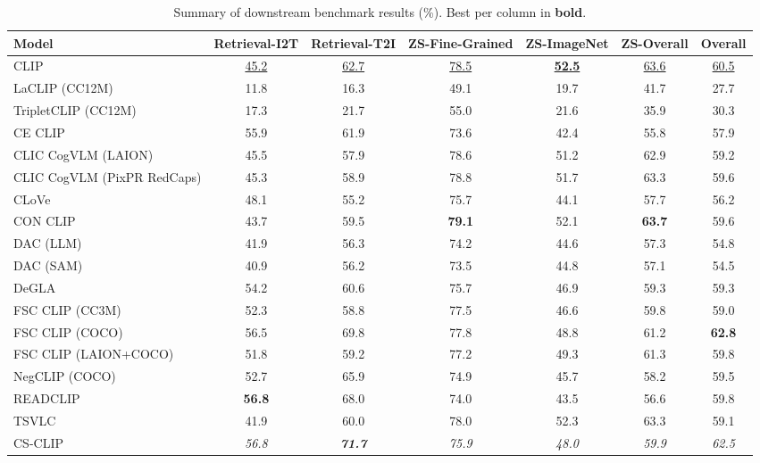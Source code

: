 \begin{table}[t]
  \centering
  \small
  \caption{Summary of downstream benchmark results (\%). Best per column in \textbf{bold}.}
  \label{tab:downstream_summary}
  \setlength{\tabcolsep}{4pt}
  \begin{tabular}{lcccccc}
    \toprule
    Model & Retrieval-I2T & Retrieval-T2I & ZS-Fine-Grained & ZS-ImageNet & ZS-Overall & Overall \\
    \midrule
    CLIP & \underline{45.2} & \underline{62.7} & \underline{78.5} & \underline{\textbf{52.5}} & \underline{63.6} & \underline{60.5} \\
    \midrule
    LaCLIP (CC12M) & 11.8 & 16.3 & 49.1 & 19.7 & 41.7 & 27.7 \\
    TripletCLIP (CC12M) & 17.3 & 21.7 & 55.0 & 21.6 & 35.9 & 30.3 \\
    \midrule
    CE CLIP & 55.9 & 61.9 & 73.6 & 42.4 & 55.8 & 57.9 \\
    CLIC CogVLM (LAION) & 45.5 & 57.9 & 78.6 & 51.2 & 62.9 & 59.2 \\
    CLIC CogVLM (PixPR RedCaps) & 45.3 & 58.9 & 78.8 & 51.7 & 63.3 & 59.6 \\
    CLoVe & 48.1 & 55.2 & 75.7 & 44.1 & 57.7 & 56.2 \\
    CON CLIP & 43.7 & 59.5 & \textbf{79.1} & 52.1 & \textbf{63.7} & 59.6 \\
    DAC (LLM) & 41.9 & 56.3 & 74.2 & 44.6 & 57.3 & 54.8 \\
    DAC (SAM) & 40.9 & 56.2 & 73.5 & 44.8 & 57.1 & 54.5 \\
    DeGLA & 54.2 & 60.6 & 75.7 & 46.9 & 59.3 & 59.3 \\
    FSC CLIP (CC3M) & 52.3 & 58.8 & 77.5 & 46.6 & 59.8 & 59.0 \\
    FSC CLIP (COCO) & 56.5 & 69.8 & 77.8 & 48.8 & 61.2 & \textbf{62.8} \\
    FSC CLIP (LAION+COCO) & 51.8 & 59.2 & 77.2 & 49.3 & 61.3 & 59.8 \\
    NegCLIP (COCO) & 52.7 & 65.9 & 74.9 & 45.7 & 58.2 & 59.5 \\
    READCLIP & \textbf{56.8} & 68.0 & 74.0 & 43.5 & 56.6 & 59.8 \\
    TSVLC & 41.9 & 60.0 & 78.0 & 52.3 & 63.3 & 59.1 \\
    \midrule
    CS-CLIP & \emph{56.8} & \emph{\textbf{71.7}} & \emph{75.9} & \emph{48.0} & \emph{59.9} & \emph{62.5} \\
    \bottomrule
  \end{tabular}
\end{table}